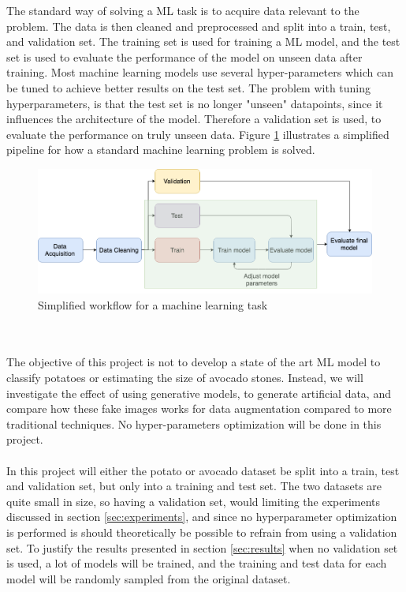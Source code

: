 \documentclass[11pt]{article}
\begin{document}
The standard way of solving a ML task is to acquire data relevant to the problem. The data is then cleaned and preprocessed and split into a train, test, and validation set. The training set is used for training a ML model, and the test set is used to evaluate the performance of the model on unseen data after training. Most machine learning models use several hyper-parameters which can be tuned to achieve better results on the test set. The problem with tuning hyperparameters, is that the test set is no longer "unseen" datapoints, since it influences the architecture of the model. Therefore a validation set is used, to evaluate the performance on truly unseen data. Figure \ref{fig:ML_data_flow} illustrates a simplified pipeline for how a standard machine learning problem is solved.
\begin{figure}[!h]
    \centering
    \includegraphics[scale = 0.45]{figurer/Introduction/data_flow_20.png}
    \caption{Simplified workflow for a machine learning task}
    \label{fig:ML_data_flow}
\end{figure}
\\ \\
The objective of this project is not to develop a state of the art ML model to classify potatoes or estimating the size of avocado stones. Instead, we will investigate the effect of using generative models, to generate artificial data, and compare how these fake images works for data augmentation compared to more traditional techniques. No hyper-parameters optimization will be done in this project.
\\ \\
In this project will either the potato or avocado dataset be split into a train, test and validation set, but only into a training and test set. The two datasets are quite small in size, so having a validation set, would limiting the experiments discussed in section \ref{sec:experiments}, and since no hyperparameter optimization is performed is should theoretically be possible to refrain from using a validation set. To justify the results presented in section \ref{sec:results} when no validation set is used, a lot of models will be trained, and the training and test data for each model will be randomly sampled from the original dataset. 
\end{document}

